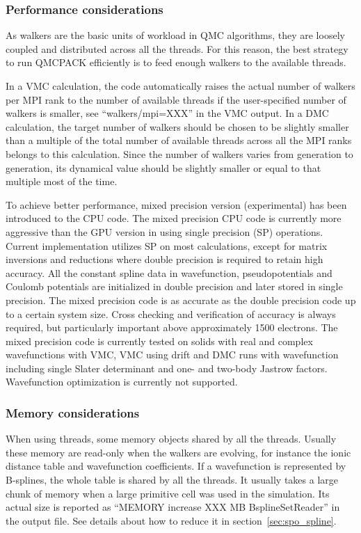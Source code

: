 \subsubsection{Performance considerations}
\label{sec:cpu:performance}
As walkers are the basic units of workload in QMC algorithms, they are loosely coupled and distributed across all the threads. For this reason, the best strategy to run QMCPACK efficiently is to feed enough walkers to the available threads.

In a VMC calculation, the code automatically raises the actual number of walkers per MPI rank to the number of available threads if the user-specified number of walkers is smaller, see ``walkers/mpi=XXX'' in the VMC output.  In a DMC calculation, the target number of walkers should be chosen to be slightly smaller than a multiple of the total number of available threads across all the MPI ranks belongs to this calculation. Since the number of walkers varies from generation to generation, its dynamical value should be slightly smaller or equal to that multiple most of the time.

To achieve better performance, mixed precision version (experimental) has been introduced to the CPU code. The mixed precision CPU code is currently more aggressive than the GPU version in using single precision (SP) operations. Current implementation utilizes SP on most calculations, except for matrix inversions and reductions where double precision is required to retain high accuracy. All the constant spline data in wavefunction, pseudopotentials and Coulomb potentials are initialized in double precision and later stored in single precision. The mixed precision code is as accurate as the double precision code up to a certain system size. Cross checking and verification of accuracy is always required, but particularly important above approximately 1500 electrons. The mixed precision code is currently tested on solids with real and complex wavefunctions with VMC, VMC using drift and DMC runs with wavefunction including single Slater determinant and one- and two-body Jastrow factors. Wavefunction optimization is currently not supported.

\subsubsection{Memory considerations}
When using threads, some memory objects shared by all the threads. Usually these memory are read-only when the walkers are evolving, for instance the ionic distance table and wavefunction coefficients.
If a wavefunction is represented by B-splines, the whole table is shared by all the threads. It usually takes a large chunk of memory when a large primitive cell was used in the simulation. Its actual size is reported as ``MEMORY increase XXX MB BsplineSetReader'' in the output file.
See details about how to reduce it in section~\ref{sec:spo_spline}.

